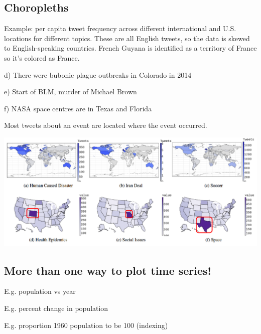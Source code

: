 \documentclass[11pt]{article}
\theoremstyle{definition}
\begin{document}
\subsection{Choropleths}
Example: per capita tweet frequency across different
international and U.S. locations for different topics. 
These are all English tweets, so the data is skewed to English-speaking countries.
French Guyana is identified as a territory of France so it's colored as France.

d) There were bubonic plague outbreaks in Colorado in 2014

e) Start of BLM, murder of Michael Brown

f) NASA space centres are in Texas and Florida

Most tweets about an event are located where the event occurred.

\includegraphics[width=\textwidth]{29.png}

\subsection{More than one way to plot time series!}

E.g. population vs year

E.g. percent  change in population 

E.g. proportion 1960 population to be 100 (indexing)
\end{document}
